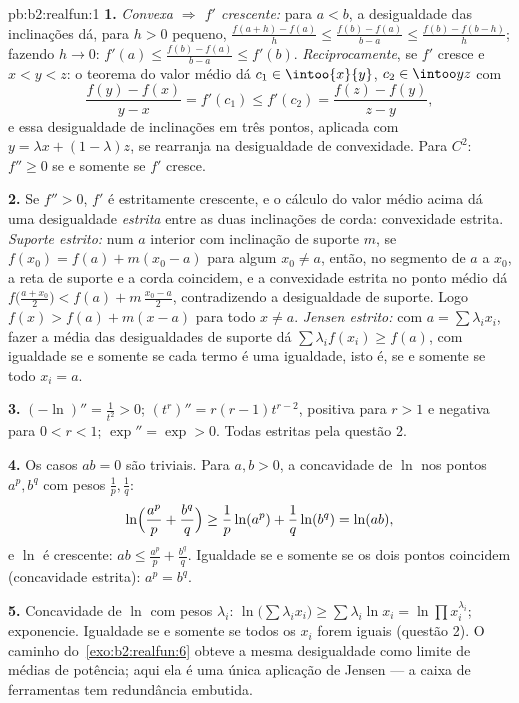 \begin{solution}{pb:b2:realfun:1}
\textbf{1.} \emph{Convexa $\Rightarrow$ $f'$ crescente:} para $a <
b$, a desigualdade das inclinações dá, para $h > 0$ pequeno, $\frac{f(a+h)
- f(a)}h \leq \frac{f(b) - f(a)}{b-a} \leq \frac{f(b) -
f(b-h)}{h}$; fazendo $h \to 0$: $f'(a) \leq \frac{f(b) -
f(a)}{b - a} \leq f'(b)$. \emph{Reciprocamente}, se $f'$ cresce
e $x < y < z$: o teorema do valor médio dá $c_1 \in
\intoo{x}{y}$, $c_2 \in \intoo yz$ com
\[
\frac{f(y) - f(x)}{y - x} = f'(c_1) \leq f'(c_2)
= \frac{f(z) - f(y)}{z - y},
\]
e essa desigualdade de inclinações em três pontos, aplicada com $y = \lambda
x + (1 - \lambda)z$, se rearranja na desigualdade de convexidade.
Para $C^2$: $f'' \geq 0$ se e somente se $f'$ cresce.

\textbf{2.} Se $f'' > 0$, $f'$ é estritamente crescente, e o
cálculo do valor médio acima dá uma desigualdade \emph{estrita}
entre as duas inclinações de corda: convexidade estrita. \emph{Suporte
estrito:} num $a$ interior com inclinação de suporte $m$, se $f(x_0) =
f(a) + m(x_0 - a)$ para algum $x_0 \neq a$, então, no segmento
de $a$ a $x_0$, a reta de suporte e a corda coincidem, e a
convexidade estrita no ponto médio dá $f\bigl(\frac{a +
x_0}2\bigr) < f(a) + m\,\frac{x_0 - a}2$, contradizendo a
desigualdade de suporte. Logo $f(x) > f(a) + m(x - a)$ para todo $x \neq
a$. \emph{Jensen estrito:} com $a = \sum\lambda_ix_i$, fazer a média
das desigualdades de suporte dá $\sum\lambda_if(x_i) \geq f(a)$,
com igualdade se e somente se cada termo é uma igualdade, isto é, se e somente se todo $x_i
= a$.

\textbf{3.} $(-\ln)'' = \frac1{t^2} > 0$; $(t^r)'' = r(r -
1)t^{r-2}$, positiva para $r > 1$ e negativa para $0 < r < 1$;
$\exp'' = \exp > 0$. Todas estritas pela questão 2.

\textbf{4.} Os casos $ab = 0$ são triviais. Para $a, b > 0$,
a concavidade de $\ln$ nos pontos $a^p, b^q$ com pesos
$\frac1p, \frac1q$:
\[
\ln\Bigl(\frac{a^p}p + \frac{b^q}q\Bigr) \geq
\frac1p\ln(a^p) + \frac1q\ln(b^q) = \ln(ab),
\]
e $\ln$ é crescente: $ab \leq \frac{a^p}p + \frac{b^q}q$.
Igualdade se e somente se os dois pontos coincidem (concavidade estrita): $a^p =
b^q$.

\textbf{5.} Concavidade de $\ln$ com pesos $\lambda_i$:
$\ln\bigl(\sum\lambda_ix_i\bigr) \geq \sum\lambda_i\ln x_i =
\ln\prod x_i^{\lambda_i}$; exponencie. Igualdade se e somente se todos os $x_i$
forem iguais (questão 2). O caminho do~\cref{exo:b2:realfun:6}
obteve a mesma desigualdade como limite de médias de potência; aqui ela é
uma única aplicação de Jensen --- a caixa de ferramentas tem redundância
embutida.


\end{solution}
